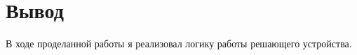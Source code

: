 \chapter{Вывод}
\label{ch:сhap5}

В ходе проделанной работы я реализовал логику работы решающего устройства.